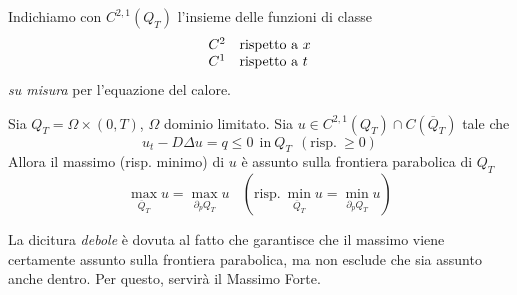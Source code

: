 \documentclass[10pt,a4paper,twoside,openright]{book}
\begin{document}
Indichiamo con $C^{2,1}(Q_{T})$ l'insieme delle funzioni di classe
\begin{equation*}
    \begin{array}{ l l }
        C^{2} & \text{rispetto a} \ x \\
        C^{1} & \text{rispetto a} \ t
    \end{array}
\end{equation*}
\textit{su misura} per l'equazione del calore.
\begin{theorem}
     Sia $Q_{T} =\Omega \times (0,T)$, $\Omega $ dominio limitato. Sia $u\in C^{2,1}(Q_{T}) \cap C(\overline{Q}_{T})$ tale che
    \begin{equation*}
        u_{t} -D\Delta u=q\leqslant 0\ \ \text{in} \ Q_{T} \ \ \left(\text{risp.} \ \geqslant 0\right)
    \end{equation*}
    Allora il massimo (risp. minimo) di $u$ è assunto sulla frontiera parabolica di $Q_{T}$
    \begin{equation*}
        \max_{\overline{Q}_{T}} u=\max_{\partial _{p} Q_{T}} u\ \ \ \ \left(\text{risp.} \ \min_{\overline{Q}_{T}} u=\min_{\partial _{p} Q_{T}} u\right)
    \end{equation*}
\end{theorem}
La dicitura \emph{debole} è dovuta al fatto che garantisce che il massimo viene certamente assunto sulla frontiera parabolica, ma non esclude che sia assunto anche dentro. Per questo, servirà il Massimo Forte.
\end{document}
